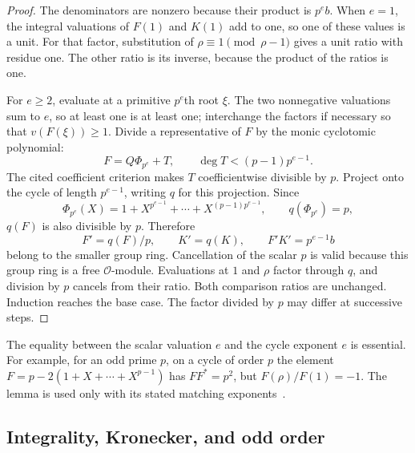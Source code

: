 \documentclass[11pt]{article}
\begin{document}
\begin{proof}
The denominators are nonzero because their product is $p^{e} b$.
When $e=1$, the integral valuations of $F(1)$ and $K(1)$ add to one,
so one of these values is a unit. For that factor, substitution of
$\rho\equiv1\pmod{\rho-1}$ gives a unit ratio with residue one.
The other ratio is its inverse, because the product of the ratios is one.

For $e\geq2$, evaluate at a primitive $p^{e}$th root $\xi$. The two
nonnegative valuations sum to $e$, so at least one is at least one;
interchange the factors if necessary so that $v(F(\xi))\geq1$.
Divide a representative of $F$ by the monic cyclotomic polynomial:
\[
 F=Q\Phi_{p^{e}}+T,\qquad \deg T<(p-1)p^{e-1}.
\]
The cited coefficient criterion makes $T$ coefficientwise divisible
by $p$. Project onto the cycle of length $p^{e-1}$, writing $q$ for
this projection. Since
\[
 \Phi_{p^{e}}(X)=1+X^{p^{e-1}}+\cdots+X^{(p-1)p^{e-1}},
 \qquad q(\Phi_{p^{e}})=p,
\]
$q(F)$ is also divisible by $p$. Therefore
\[
 F'=q(F)/p,\qquad K'=q(K),\qquad F'K'=p^{e-1}b
\]
belong to the smaller group ring. Cancellation of the scalar $p$ is
valid because this group ring is a free $\mathcal O$-module.
Evaluations at $1$ and $\rho$ factor through $q$, and division by $p$
cancels from their ratio. Both comparison ratios are unchanged.
Induction reaches the base case. The factor divided by $p$ may differ
at successive steps.
\end{proof}

The equality between the scalar valuation $e$ and the cycle exponent
$e$ is essential. For example, for an odd prime $p$, on a cycle of order
$p$ the element
$F=p-2(1+X+\cdots+X^{p-1})$ has $FF^{*}=p^{2}$, but
$F(\rho)/F(1)=-1$. The lemma is used only with its stated matching
exponents~\cite[Remark~3.2]{circulant-source}.

\subsection{Integrality, Kronecker, and odd order}
\end{document}
